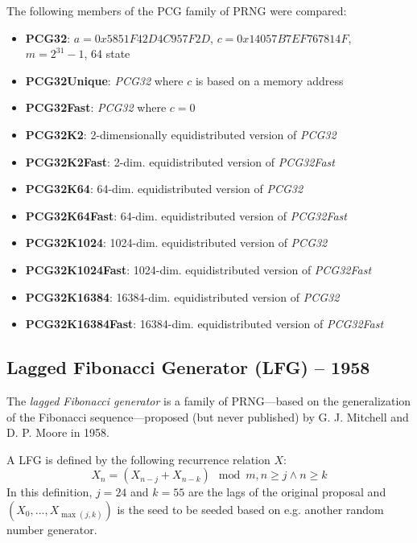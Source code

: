     The following members of the PCG family of PRNG were compared:
    \begin{itemize}
		\itemsep0em
        \item \textbf{PCG32}:           $a = 0x5851F42D4C957F2D$, $c = 0x14057B7EF767814F$, $m = 2^{31} - 1$, \SI{64}{\bit} state
        \item \textbf{PCG32Unique}:     \textit{PCG32} where $c$ is based on a memory address
        \item \textbf{PCG32Fast}:       \textit{PCG32} where $c = 0$
        \item \textbf{PCG32K2}:         2-dimensionally equidistributed version of \textit{PCG32}
        \item \textbf{PCG32K2Fast}:     2-dim. equidistributed version of \textit{PCG32Fast}
        \item \textbf{PCG32K64}:        64-dim. equidistributed version of \textit{PCG32}
        \item \textbf{PCG32K64Fast}:    64-dim. equidistributed version of \textit{PCG32Fast}
        \item \textbf{PCG32K1024}:      1024-dim. equidistributed version of \textit{PCG32}
        \item \textbf{PCG32K1024Fast}:  1024-dim. equidistributed version of \textit{PCG32Fast}
        \item \textbf{PCG32K16384}:     16384-dim. equidistributed version of \textit{PCG32}
        \item \textbf{PCG32K16384Fast}: 16384-dim. equidistributed version of \textit{PCG32Fast}
    \end{itemize}

\subsection[Lagged Fibonacci Generator (LFG) -- 1958]{Lagged Fibonacci Generator (LFG) -- 1958} \label{subsec:lfg}

    The \emph{lagged Fibonacci generator} is a family of PRNG---based on the generalization of the Fibonacci sequence---proposed (but never published) by G. J. Mitchell and D. P. Moore in 1958.

    A LFG is defined by the following recurrence relation $X$:
    \begin{equation*}
        X_n = \left(X_{n - j} + X_{n - k}\right) \mod m, n \geq j \land n \geq k
    \end{equation*}
    In this definition, $j = 24$ and $k = 55$ are the lags of the original proposal and $\left(X_0, ..., X_{\max\left(j, k\right)}\right)$ is the seed to be seeded based on e.g. another random number generator.

